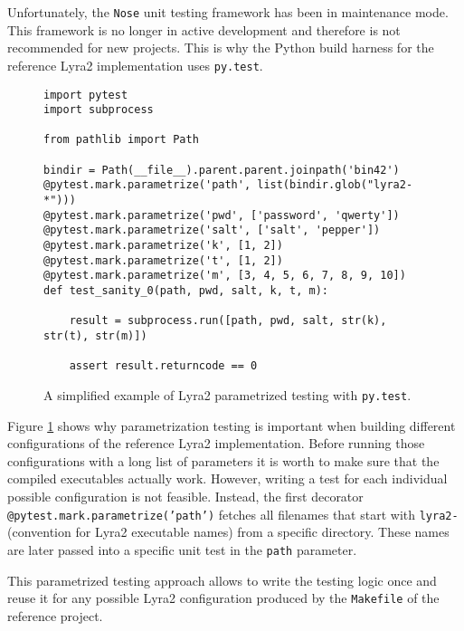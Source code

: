 Unfortunately, the \texttt{Nose} unit testing framework has been in maintenance mode. This framework is no longer in active development and therefore is not recommended for new projects. This is why the Python build harness for the reference Lyra2 implementation uses \texttt{py.test}.

\begin{figure}
\begin{verbatim}
import pytest
import subprocess

from pathlib import Path

bindir = Path(__file__).parent.parent.joinpath('bin42')
@pytest.mark.parametrize('path', list(bindir.glob("lyra2-*")))
@pytest.mark.parametrize('pwd', ['password', 'qwerty'])
@pytest.mark.parametrize('salt', ['salt', 'pepper'])
@pytest.mark.parametrize('k', [1, 2])
@pytest.mark.parametrize('t', [1, 2])
@pytest.mark.parametrize('m', [3, 4, 5, 6, 7, 8, 9, 10])
def test_sanity_0(path, pwd, salt, k, t, m):

    result = subprocess.run([path, pwd, salt, str(k), str(t), str(m)])

    assert result.returncode == 0
\end{verbatim}
\caption{A simplified example of Lyra2 parametrized testing with \texttt{py.test}.}
\label{fig:pytest-parametrization}
\end{figure}

Figure \ref{fig:pytest-parametrization} shows why parametrization testing is important when building different configurations of the reference Lyra2 implementation. Before running those configurations with a long list of parameters it is worth to make sure that the compiled executables actually work. However, writing a test for each individual possible configuration is not feasible. Instead, the first decorator \texttt{@pytest.mark.parametrize('path')} fetches all filenames that start with \texttt{lyra2-} (convention for Lyra2 executable names) from a specific directory. These names are later passed into a specific unit test in the \texttt{path} parameter.

This parametrized testing approach allows to write the testing logic once and reuse it for any possible Lyra2 configuration produced by the \texttt{Makefile} of the reference project.
